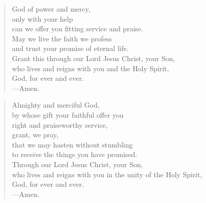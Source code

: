 \prayer

\setlength{\leftmargini}{\prayerleftmargini}

\begin{verse}
God of power and mercy,\\
only with your help\\
can we offer you fitting service and praise.\\
May we live the faith we profess\\
and trust your promise of eternal life.\\
Grant this through our Lord Jesus Christ, your Son,\\
who lives and reigns with you and the Holy Spirit,\\
God, for ever and ever.\\
{\color{red}---\thinspace}Amen.
\end{verse}


\begin{verse}
Almighty and merciful God,\\
by whose gift your faithful offer you\\
right and praiseworthy service,\\
grant, we pray,\\
that we may hasten without stumbling\\
to receive the things you have promised.\\
Through our Lord Jesus Christ, your Son,\\
who lives and reigns with you in the unity of the Holy Spirit,\\
God, for ever and ever.\\
{\color{red}---\thinspace}Amen.
\end{verse}

\setlength{\leftmargini}{\defleftmargini}